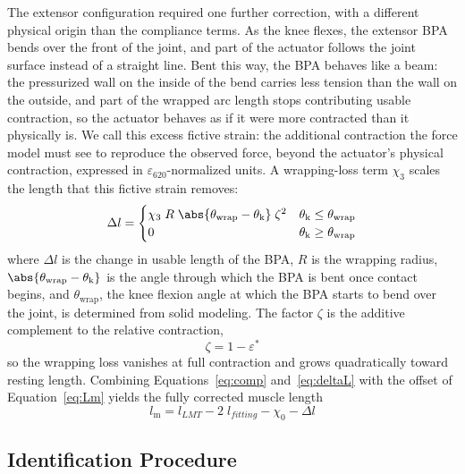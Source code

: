 The extensor configuration required one further correction, with a different physical origin than the compliance terms. As the knee flexes, the extensor BPA bends over the front of the joint, and part of the actuator follows the joint surface instead of a straight line. Bent this way, the BPA behaves like a beam: the pressurized wall on the inside of the bend carries less tension than the wall on the outside, and part of the wrapped arc length stops contributing usable contraction, so the actuator behaves as if it were more contracted than it physically is. We call this excess fictive strain: the additional contraction the force model must see to reproduce the observed force, beyond the actuator's physical contraction, expressed in $\varepsilon_{620}$-normalized units. A wrapping-loss term $\chi_{3}$ scales the length that this fictive strain removes:
\begin{equation}
    \Delta l = \begin{cases}
     \chi_{3}\;R\;\abs{ \theta_\text{wrap}-\theta_\text{k}}\;\zeta^2 & \theta_\text{k} \leq      \theta_\text{wrap} \\
      0 & \theta_\text{k} \geq      \theta_\text{wrap}
     \end{cases}\label{eq:deltaL}
\end{equation}
where $\Delta l$ is the change in usable length of the BPA, $R$ is the wrapping radius, $\abs{\theta_\text{wrap}-\theta_\text{k}}$ is the angle through which the BPA is bent once contact begins, and $\theta_\text{wrap}$, the knee flexion angle at which the BPA starts to bend over the joint, is determined from solid modeling. The factor $\zeta$ is the additive complement to the relative contraction,
\begin{equation}
    \zeta = 1-\varepsilon^*
\label{eq:comp}
\end{equation}
so the wrapping loss vanishes at full contraction and grows quadratically toward resting length. Combining Equations~\eqref{eq:comp} and~\eqref{eq:deltaL} with the offset of Equation~\eqref{eq:Lm} yields the fully corrected muscle length
\begin{equation}
    l_\text{m} = l_{LMT} - 2\;l_{fitting}  - \chi_{0} - \Delta l\label{eq:x3}
\end{equation}

\subsection{Identification Procedure}\label{sec:identification}

